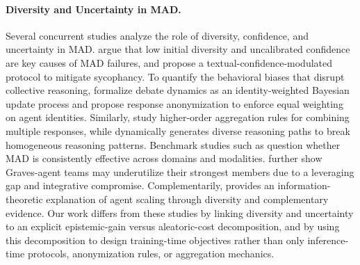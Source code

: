 \documentclass{article}
\theoremstyle{plain}
\theoremstyle{definition}
\theoremstyle{remark}
\begin{document}
\paragraph{Diversity and Uncertainty in MAD.}
Several concurrent studies analyze the role of diversity, confidence, and uncertainty in MAD. \citet{zhu2026demystifying} argue that low initial diversity and uncalibrated confidence are key causes of MAD failures, and propose a textual-confidence-modulated protocol to mitigate sycophancy. To quantify the behavioral biases that disrupt collective reasoning, \citet{choi2025identity} formalize debate dynamics as an identity-weighted Bayesian update process and propose response anonymization to enforce equal weighting on agent identities. Similarly, \citet{ai2025beyond} study higher-order aggregation rules for combining multiple responses, while \citet{li2026dynadebate} dynamically generates diverse reasoning paths to break homogeneous reasoning patterns. Benchmark studies such as \citet{li2026m3mad} question whether MAD is consistently effective across domains and modalities. \citet{pappu2026multi} further show Graves-agent teams may underutilize their strongest members due to a leveraging gap and integrative compromise. Complementarily, \citet{yang2026understanding} provides an information-theoretic explanation of agent scaling through diversity and complementary evidence. Our work differs from these studies by linking diversity and uncertainty to an explicit epistemic-gain versus aleatoric-cost decomposition, and by using this decomposition to design training-time objectives rather than only inference-time protocols, anonymization rules, or aggregation mechanics.
\end{document}
